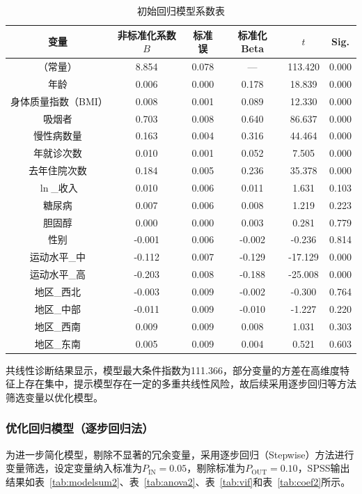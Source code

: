 \documentclass[a4paper]{ctexart}
\begin{document}
\begin{table}[H]
\centering
\caption{初始回归模型系数表}
\label{tab:coef1}
\begin{tabular}{c c c c c c}
\toprule
变量 & 非标准化系数\(B\) & 标准误 & 标准化Beta & \(t\) & Sig. \\
\midrule
（常量） & 8.854 & 0.078 & — & 113.420 & 0.000 \\
年龄 & 0.006 & 0.000 & 0.178 & 18.839 & 0.000 \\
身体质量指数（BMI） & 0.008 & 0.001 & 0.089 & 12.330 & 0.000 \\
吸烟者 & 0.703 & 0.008 & 0.640 & 86.637 & 0.000 \\
慢性病数量 & 0.163 & 0.004 & 0.316 & 44.464 & 0.000 \\
年就诊次数 & 0.010 & 0.001 & 0.052 & 7.505 & 0.000 \\
去年住院次数 & 0.184 & 0.005 & 0.236 & 35.378 & 0.000 \\
\(\ln\)\_收入 & 0.010 & 0.006 & 0.011 & 1.631 & 0.103 \\
糖尿病 & 0.007 & 0.006 & 0.008 & 1.219 & 0.223 \\
胆固醇 & 0.000 & 0.000 & 0.003 & 0.281 & 0.779 \\
性别 & -0.001 & 0.006 & -0.002 & -0.236 & 0.814 \\
运动水平\_中 & -0.112 & 0.007 & -0.129 & -17.129 & 0.000 \\
运动水平\_高 & -0.203 & 0.008 & -0.188 & -25.008 & 0.000 \\
地区\_西北 & -0.003 & 0.009 & -0.002 & -0.300 & 0.764 \\
地区\_中部 & -0.011 & 0.009 & -0.010 & -1.227 & 0.220 \\
地区\_西南 & 0.009 & 0.009 & 0.008 & 1.031 & 0.303 \\
地区\_东南 & 0.005 & 0.009 & 0.004 & 0.521 & 0.603 \\
\bottomrule
\end{tabular}
\end{table}

共线性诊断结果显示，模型最大条件指数为111.366，部分变量的方差在高维度特征上存在集中，提示模型存在一定的多重共线性风险，故后续采用逐步回归等方法筛选变量以优化模型。

\subsubsection{优化回归模型（逐步回归法）}

为进一步简化模型，剔除不显著的冗余变量，采用逐步回归（Stepwise）方法进行变量筛选，设定变量纳入标准为\(P_{\text{IN}}=0.05\)，剔除标准为\(P_{\text{OUT}}=0.10\)，SPSS输出结果如表~\ref{tab:modelsum2}、表~\ref{tab:anova2}、表~\ref{tab:vif}和表~\ref{tab:coef2}所示。
\end{document}
